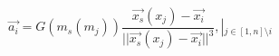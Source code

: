 \documentclass{article}
\begin{document}
\begin{equation*}
\vec{a_i} = G \left( m_s(m_j) \right) \frac{\vec{x_s}(x_j) - \vec{x_i}}{||\vec{x_s}(x_j) - \vec{x_i}||^3}, \left|_{j \in [1, n] \setminus i} \right.
\end{equation*}
\end{document}
